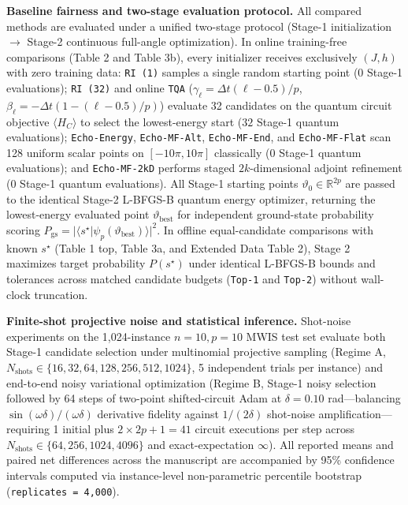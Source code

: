 \documentclass[10pt,a4paper]{article}
\begin{document}
\textbf{Baseline fairness and two-stage evaluation protocol.} All compared methods are evaluated under a unified two-stage protocol (Stage-1 initialization $\rightarrow$ Stage-2 continuous full-angle optimization). In online training-free comparisons (Table 2 and Table 3b), every initializer receives exclusively $(J, h)$ with zero training data: \texttt{RI (1)} samples a single random starting point ($0$ Stage-1 evaluations); \texttt{RI (32)} and online \texttt{TQA} ($\gamma_\ell = \Delta t(\ell - 0.5)/p$, $\beta_\ell = -\Delta t(1 - (\ell - 0.5)/p)$) evaluate 32 candidates on the quantum circuit objective $\langle H_C \rangle$ to select the lowest-energy start ($32$ Stage-1 quantum evaluations); \texttt{Echo-Energy}, \texttt{Echo-MF-Alt}, \texttt{Echo-MF-End}, and \texttt{Echo-MF-Flat} scan 128 uniform scalar points on $[-10\pi, 10\pi]$ classically ($0$ Stage-1 quantum evaluations); and \texttt{Echo-MF-2kD} performs staged $2k$-dimensional adjoint refinement ($0$ Stage-1 quantum evaluations). All Stage-1 starting points $\vartheta_0 \in \mathbb{R}^{2p}$ are passed to the identical Stage-2 L-BFGS-B quantum energy optimizer, returning the lowest-energy evaluated point $\vartheta_{\mathrm{best}}$ for independent ground-state probability scoring $P_{\mathrm{gs}} = |\langle s^\star | \psi_p(\vartheta_{\mathrm{best}}) \rangle|^2$. In offline equal-candidate comparisons with known $s^\star$ (Table 1 top, Table 3a, and Extended Data Table 2), Stage 2 maximizes target probability $P(s^\star)$ under identical L-BFGS-B bounds and tolerances across matched candidate budgets (\texttt{Top-1} and \texttt{Top-2}) without wall-clock truncation.

\textbf{Finite-shot projective noise and statistical inference.} Shot-noise experiments on the 1,024-instance $n = 10, p = 10$ MWIS test set evaluate both Stage-1 candidate selection under multinomial projective sampling (Regime A, $N_{\mathrm{shots}} \in \{16, 32, 64, 128, 256, 512, 1024\}$, 5 independent trials per instance) and end-to-end noisy variational optimization (Regime B, Stage-1 noisy selection followed by 64 steps of two-point shifted-circuit Adam at $\delta = 0.10$ rad---balancing $\sin(\omega\delta)/(\omega\delta)$ derivative fidelity against $1/(2\delta)$ shot-noise amplification---requiring 1 initial plus $2 \times 2p + 1 = 41$ circuit executions per step across $N_{\mathrm{shots}} \in \{64, 256, 1024, 4096\}$ and exact-expectation $\infty$). All reported means and paired net differences across the manuscript are accompanied by 95\% confidence intervals computed via instance-level non-parametric percentile bootstrap (\texttt{replicates = 4,000}).
\end{document}
